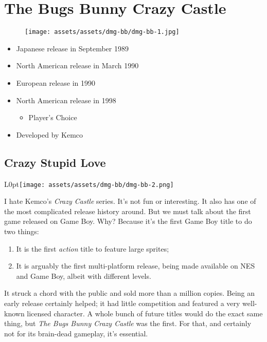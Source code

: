 \documentclass{book}
\begin{document}
\chapter*{The Bugs Bunny Crazy Castle}
\vspace{\baselineskip}\begin{figure}[H]{\texttt{[image: assets/assets/dmg-bb/dmg-bb-1.jpg]}}\end{figure}\vspace{\baselineskip}
\begin{itemize}[left=0pt, nosep]
\item Japanese release in September 1989
\item North American release in March 1990
\item European release in 1990
\item North American release in 1998
\begin{itemize}
\item Player’s Choice
\end{itemize}
\item Developed by Kemco

\end{itemize}
\newpage\FloatBarrier\section*{Crazy Stupid Love}
\begin{wrapfigure}{L}{0pt}{\texttt{[image: assets/assets/dmg-bb/dmg-bb-2.png]}}\end{wrapfigure}\noindent
I hate Kemco’s \emph{Crazy Castle} series. It’s not fun or interesting. It also has one of the most complicated release history around. But we must talk about the first game released on Game Boy. Why? Because it’s the first Game Boy title to do two things:\par
\begin{enumerate}
\item It is the first \emph{action} title to feature large sprites;
\item It is arguably the first multi-platform release, being made available on NES and Game Boy, albeit with different levels.
\end{enumerate}
It struck a chord with the public and sold more than a million copies. Being an early release certainly helped; it had little competition and featured a very well-known licensed character. A whole bunch of future titles would do the exact same thing, but \emph{The Bugs Bunny Crazy Castle} was the first. For that, and certainly not for its brain-dead gameplay, it’s essential.\par
\end{document}
